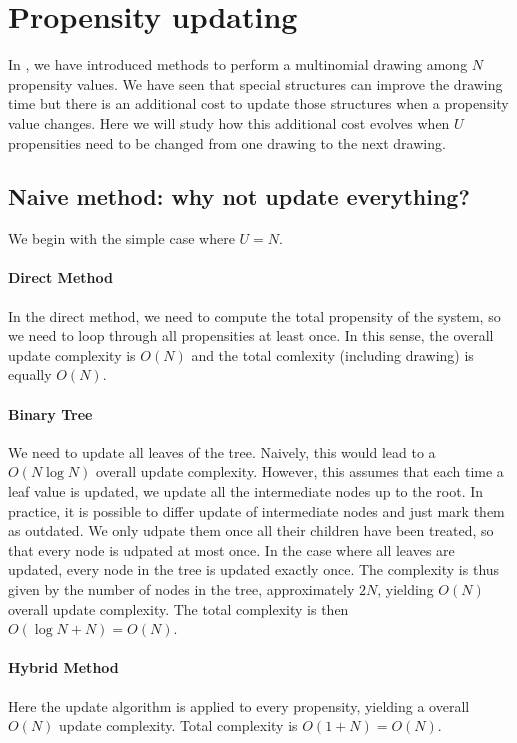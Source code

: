 \section {Propensity updating}
\label{sec:reaction_update}

In , we have introduced methods to perform a multinomial drawing among $N$ propensity values. We have seen that special structures can improve the drawing time but there is an additional cost to update those structures when a propensity value changes. Here we will study how this additional cost evolves when $U$ propensities need to be changed from one drawing to the next drawing.

\subsection {Naive method: why not update everything?}

We begin with the simple case where $U = N$.

\paragraph{Direct Method} In the direct method, we need to compute the total propensity of the system, so we need to loop through all propensities at least once. In this sense, the overall update complexity is $O(N)$ and the total comlexity (including drawing) is equally $O(N)$.

\paragraph{Binary Tree} We need to update all leaves of the tree. Naively, this would lead to a $O(N\log N)$ overall update complexity. However, this assumes that each time a leaf value is updated, we update all the intermediate nodes up to the root. In practice, it is possible to differ update of intermediate nodes and just mark them as outdated. We only udpate them once all their children have been treated, so that every node is udpated at most once. In the case where all leaves are updated, every node in the tree is updated exactly once. The complexity is thus given by the number of nodes in the tree, approximately $2N$, yielding $O(N)$ overall update complexity. The total complexity is then $O(\log N + N) = O(N)$.

\paragraph{Hybrid Method} Here the update algorithm is applied to every propensity, yielding a overall $O(N)$ update complexity. Total complexity is $O(1 + N) = O(N)$.

